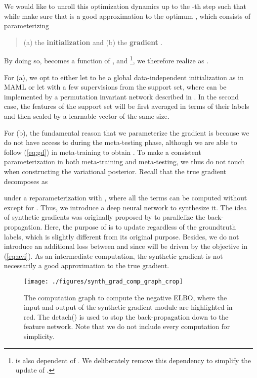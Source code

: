 \documentclass{article} \usepackage{iclr2020_conference,times}
\def\eqref#1{(\ref{#1})}
\begin{document}
We would like to unroll this optimization dynamics up to the -th step such that 
while make sure that  is a good approximation to the optimum ,
which consists of parameterizing 
\begin{quote}
    (a) the \textbf{initialization}  and 
    (b) the \textbf{gradient} .
\end{quote}
By doing so,  becomes a function of ,  and \footnote{
 is also dependent of . We deliberately remove this dependency to simplify the update of .}, 
we therefore realize  as .

For (a), we opt to either let  to be a global data-independent initialization as in MAML \citep{finn2017model}
or let  with a few supervisions from the support set,
where  can be implemented by a permutation invariant network described in \citet{gidaris2018dynamic}. 
In the second case, the features of the support set will be first averaged in terms of their labels
and then scaled by a learnable vector of the same size.

For (b), the fundamental reason that we parameterize the gradient is because we do not have access to  during the meta-testing phase, although
we are able to follow \eqref{eq:gd} in meta-training to obtain .
To make a consistent parameterization in both meta-training and meta-testing, we thus do not touch  when constructing the variational posterior.  
Recall that the true gradient decomposes as

under a reparameterization  with ,
where all the terms can be computed without  
except for .
Thus, we introduce a deep neural network  to synthesize it.
The idea of synthetic gradients was originally proposed by \citet{jaderberg2017decoupled} to 
parallelize the back-propagation. Here, the purpose of  is to update  regardless of the groundtruth labels,
which is slightly different from its original purpose. 
Besides, we do not introduce an additional loss 
between  and 
since  will be driven by the objective in \eqref{eq:avi}.
As an intermediate computation, the synthetic gradient is not necessarily a good approximation to the true gradient.



\begin{figure*}[t]
    \centering
    \texttt{[image: ./figures/synth\_grad\_comp\_graph\_crop]}\\
    \caption{The computation graph to compute the negative ELBO, 
    where the input and output of the synthetic gradient module are highlighted in red.
    The detach() is used to stop the back-propagation down to the feature network.
Note that we do not include every computation for simplicity.
    }
	\label{fig:cg}
\end{figure*}
\end{document}
